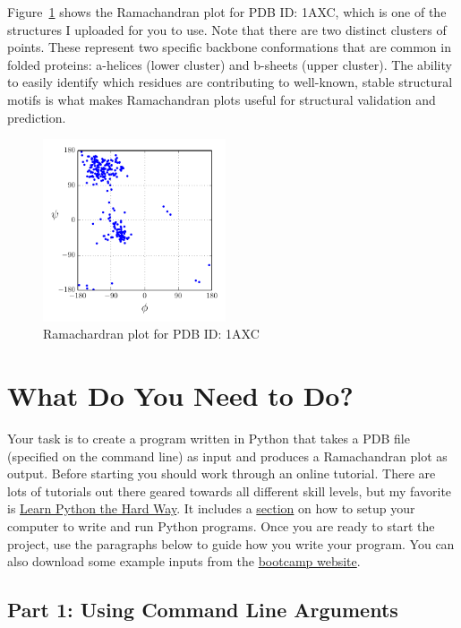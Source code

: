 \documentclass{article}
\newcommand{\ahelices}{\textgreek{a}-helices}
\newcommand{\bsheets}{\textgreek{b}-sheets}
\begin{document}
Figure~\ref{fig:example-plot} shows the Ramachandran plot for PDB ID: 1AXC, 
which is one of the structures I uploaded for you to use.  Note that there are 
two distinct clusters of points.  These represent two specific backbone 
conformations that are common in folded proteins: \ahelices{} (lower cluster) 
and \bsheets{} (upper cluster).  The ability to easily identify which residues 
are contributing to well-known, stable structural motifs is what makes 
Ramachandran plots useful for structural validation and prediction. 

\begin{figure}
 \centering
 \includegraphics[width=0.48\textwidth]{example-plot}
 \caption{Ramachardran plot for PDB ID: 1AXC}
 \label{fig:example-plot}
\end{figure}

\section{What Do You Need to Do?}

Your task is to create a program written in Python that takes a PDB file 
(specified on the command line) as input and produces a Ramachandran plot as 
output.  Before starting you should work through an online tutorial.  There are 
lots of tutorials out there geared towards all different skill levels, but my 
favorite is \href{http://learnpythonthehardway.org/book}{Learn Python the Hard 
Way}.  It  includes  a 
\href{http://learnpythonthehardway.org/book/ex0.html}{section} on how to setup 
your computer to write and run Python programs.  Once you are ready to start 
the project, use the paragraphs below to guide how you write your  program.  
You can also download some example inputs from the
\href{http://bootcamp.ipqb.org/programming}{bootcamp website}.

\subsection{Part 1: Using Command Line Arguments}
\end{document}
